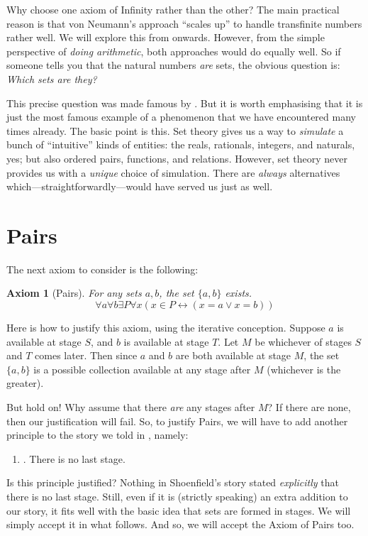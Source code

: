 \documentclass[10pt,a4paper]{article}
\makeatletter
\theoremstyle{plain}
\newtheorem{axiom}{Axiom}
\theoremstyle{definition}
\theoremstyle{remark}
\newcommand*{\olfileid}[3]{}
\newcommand*{\olsection}[1]{\section*{#1}}
\newcommand{\olref}{\@ifnextchar[{\olref@i}{\olref@final}}
\def\olref@i[#1]{\@ifnextchar[{\olref@ii}{\olref@final}}
\def\olref@ii[#1]{\@ifnextchar[{\olref@iii}{\olref@final}}
\def\olref@iii[#1]{\olref@final}
\def\olref@final#1{\ref{#1}}
\providecommand{\liff}{\mathbin{\leftrightarrow}}
\providecommand{\citet}[1]{\cite{#1}}
\makeatother
\begin{document}
Why choose one axiom of Infinity rather than the other? The main
practical reason is that von Neumann's approach ``scales up'' to
handle transfinite numbers rather well. We will explore this from
\olref[ordinals][]{chap} onwards. However, from the simple
perspective of \emph{doing arithmetic}, both approaches would do
equally well. So if someone tells you that the natural numbers
\emph{are} sets, the obvious question is: \emph{Which sets are they?} 

This precise question was made famous by \citet{Benacerraf1965}. But
it is worth emphasising that it is just the most famous example of a
phenomenon that we have encountered many times already. The basic
point is this. Set theory gives us a way to \emph{simulate} a bunch of
``intuitive'' kinds of entities: the reals, rationals, integers, and
naturals, yes; but also ordered pairs, functions, and relations.
However, set theory never provides us with a \emph{unique} choice of
simulation. There are \emph{always} alternatives
which---straightforwardly---would have served us just as well. 



\olfileid{sth}{z}{pairs}
\olsection{Pairs}

The next axiom to consider is the following:

\begin{axiom}[Pairs]
For any sets $a, b$, the set $\{a, b\}$ exists.
\[
	\forall a \forall b \exists P \forall x (x \in P \liff (x = a \lor x = b))
\]
\end{axiom}

Here is how to justify this axiom, using the iterative conception. Suppose $a$ is available at stage $S$, and $b$ is available at stage $T$. Let $M$ be whichever of stages $S$ and $T$ comes later. Then since $a$ and $b$ are both available at stage $M$, the set $\{a,b\}$ is a possible collection available at any stage after $M$ (whichever is the greater).

But hold on!{} Why assume that there \emph{are} any stages after $M$? If there are none, then our justification will fail. So, to justify Pairs, we will have to add another principle to the story we told in \olref[sth][z][story]{sec}, namely:
\begin{enumerate}
	\item[] \stagessucc. There is no last stage.
\end{enumerate}
Is this principle justified? Nothing in Shoenfield's story stated
\emph{explicitly} that there is no last stage. Still, even if it is
(strictly speaking) an extra addition to our story, it fits well with
the basic idea that sets are formed in stages. We will simply accept
it in what follows. And so, we will accept the Axiom of Pairs too.
\end{document}
